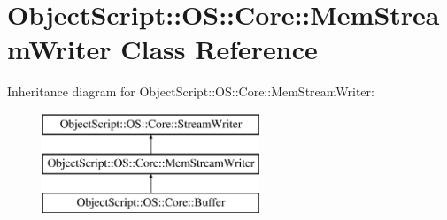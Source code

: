 \hypertarget{class_object_script_1_1_o_s_1_1_core_1_1_mem_stream_writer}{}\section{Object\+Script\+:\+:OS\+:\+:Core\+:\+:Mem\+Stream\+Writer Class Reference}
\label{class_object_script_1_1_o_s_1_1_core_1_1_mem_stream_writer}
Inheritance diagram for Object\+Script\+:\+:OS\+:\+:Core\+:\+:Mem\+Stream\+Writer\+:\begin{figure}[H]
\begin{center}
\leavevmode
\includegraphics[height=3.000000cm]{class_object_script_1_1_o_s_1_1_core_1_1_mem_stream_writer}
\end{center}
\end{figure}
